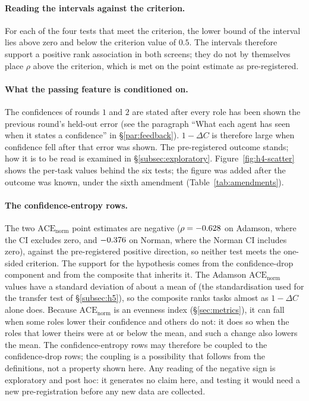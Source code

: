 \paragraph{Reading the intervals against the criterion.} For each of the four tests that meet
the criterion, the lower bound of the interval lies above zero and below the criterion value of
$0.5$. The intervals therefore support a positive rank association in both screens; they do not
by themselves place $\rho$ above the criterion, which is met on the point estimate as
pre-registered.

\paragraph{What the passing feature is conditioned on.} The confidences of rounds $1$ and $2$
are stated after every role has been shown the previous round's held-out error (see the paragraph
``What each agent has seen when it states a confidence'' in \S\ref{par:feedback}).
$1-\Delta C$ is therefore large when confidence fell after that error was shown. The
pre-registered outcome stands; how it is to be read is examined in \S\ref{subsec:exploratory}.
Figure~\ref{fig:h4-scatter} shows the per-task values behind the six tests; the figure was
added after the outcome was known, under the sixth amendment (Table~\ref{tab:amendments}).

\paragraph{The confidence-entropy rows.} The two $\mathrm{ACE}_{\mathrm{norm}}$ point estimates are
negative ($\rho=-0.628$ on Adamson, where the CI excludes zero, and
$-0.376$ on Norman, where the Norman CI includes zero), against the pre-registered
positive direction, so neither test meets the one-sided criterion. The support for the
hypothesis comes from the confidence-drop component and from the composite that inherits it. The
Adamson $\mathrm{ACE}_{\mathrm{norm}}$ values have a standard deviation of \resHFiveStdSdAce{}
about a mean of \resHFiveStdMeanAce{} (the standardisation used for the transfer test of \S\ref{subsec:h5}), so
the composite ranks tasks almost as $1-\Delta C$ alone does. Because
$\mathrm{ACE}_{\mathrm{norm}}$ is an evenness index (\S\ref{sec:metrics}), it can fall when some
roles lower their confidence and others do not: it does so when the roles that lower theirs
were at or below the mean, and such a change also lowers the mean. The confidence-entropy rows
may therefore be coupled to the confidence-drop rows; the coupling is a possibility that
follows from the definitions, not a property shown here. Any reading of the negative sign is
exploratory and post hoc: it generates no claim here, and testing it would need a new
pre-registration before any new data are collected.

